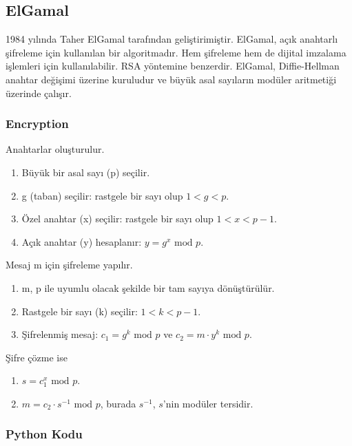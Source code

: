 \newpage

\subsection{ElGamal}

1984 yılında Taher ElGamal tarafından geliştirimiştir. ElGamal, açık anahtarlı şifreleme için kullanılan bir algoritmadır. Hem şifreleme hem de dijital imzalama işlemleri için kullanılabilir. RSA yöntemine benzerdir. ElGamal, Diffie-Hellman anahtar değişimi üzerine kuruludur ve büyük asal sayıların modüler aritmetiği üzerinde çalışır. 

\subsubsection{Encryption}

Anahtarlar oluşturulur.

\begin{enumerate}
    \item Büyük bir asal sayı (p) seçilir.
    \item g (taban) seçilir: rastgele bir sayı olup $1 < g < p$.
    \item Özel anahtar (x) seçilir: rastgele bir sayı olup $1 < x < p - 1$.
    \item Açık anahtar (y) hesaplanır: $y = g^x \text{ mod } p$.
\end{enumerate}

Mesaj m için şifreleme yapılır.

\begin{enumerate}
    \item m, p ile uyumlu olacak şekilde bir tam sayıya dönüştürülür.
    \item Rastgele bir sayı (k) seçilir: $1 < k < p - 1$.
    \item Şifrelenmiş mesaj: $c_1 = g^k \text{ mod } p$ ve $c_2 = m \cdot y^k \text{ mod } p$.
\end{enumerate}

Şifre çözme ise

\begin{enumerate}
    \item $s = c_{1}^{x} \text{ mod } p$.
    \item $m = c_2 \cdot s^{-1} \text{ mod } p$, burada $s^{-1}$, $s$'nin modüler tersidir.
\end{enumerate}

\subsubsection{Python Kodu}

